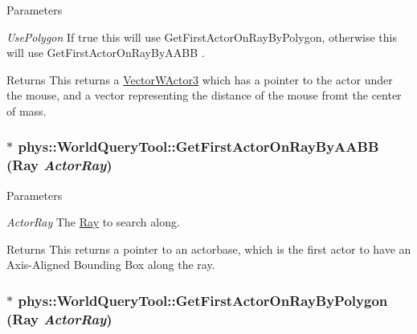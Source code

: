 \begin{DoxyParams}{Parameters}
\item[{\em UsePolygon}]If true this will use GetFirstActorOnRayByPolygon, otherwise this will use GetFirstActorOnRayByAABB . \end{DoxyParams}
\begin{DoxyReturn}{Returns}
This returns a \hyperlink{classphys_1_1VectorWActor3}{VectorWActor3} which has a pointer to the actor under the mouse, and a vector representing the distance of the mouse fromt the center of mass. 
\end{DoxyReturn}
\hypertarget{classphys_1_1WorldQueryTool_abaa9f42bc286d1d87b00c65e1212d852}{
\subsubsection[{GetFirstActorOnRayByAABB}]{$\ast$ phys::WorldQueryTool::GetFirstActorOnRayByAABB ({\bf Ray} {\em ActorRay})}}
\label{d8/d69/classphys_1_1WorldQueryTool_abaa9f42bc286d1d87b00c65e1212d852}

\begin{DoxyParams}{Parameters}
\item[{\em ActorRay}]The \hyperlink{classphys_1_1Ray}{Ray} to search along. \end{DoxyParams}
\begin{DoxyReturn}{Returns}
This returns a pointer to an actorbase, which is the first actor to have an Axis-\/Aligned Bounding Box along the ray. 
\end{DoxyReturn}
\hypertarget{classphys_1_1WorldQueryTool_a7921889d3bb3fbf74e37ee87bd9f4de4}{
\subsubsection[{GetFirstActorOnRayByPolygon}]{ $\ast$ phys::WorldQueryTool::GetFirstActorOnRayByPolygon ({\bf Ray} {\em ActorRay})}}
\label{d8/d69/classphys_1_1WorldQueryTool_a7921889d3bb3fbf74e37ee87bd9f4de4}


